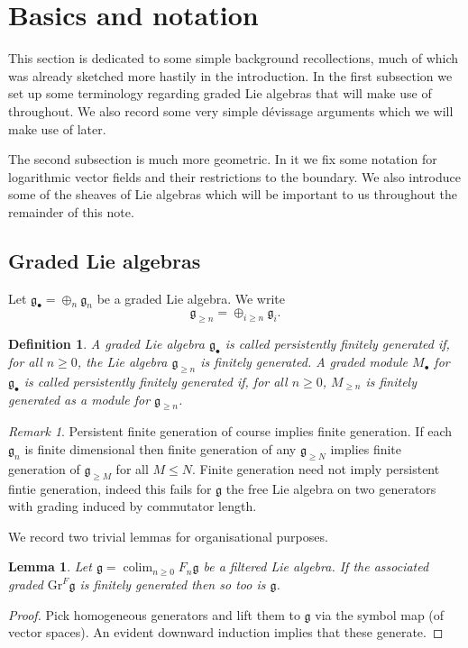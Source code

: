 \documentclass[12pt, oneside]{amsart}       %
\newtheorem{definition}[theorem]{Definition}
\newtheorem{lemma}[theorem]{Lemma}
\theoremstyle{remark}
\newtheorem*{remark}{Remark}
\renewcommand{\geq}{\geqslant}
\renewcommand{\leq}{\leqslant}
\newcommand{\clm}{\operatorname{colim}}
\newcommand{\g}{\mathfrak{g}}
\begin{document}
\section{Basics and notation}This section is dedicated to some simple background recollections, much of which was already sketched more hastily in the introduction. In the first subsection we set up some terminology regarding graded Lie algebras that will make use of throughout. We also record some very simple d\'{e}vissage arguments which we will make use of later. 

The second subsection is much more geometric. In it we fix some notation for logarithmic vector fields and their restrictions to the boundary. We also introduce some of the sheaves of Lie algebras which will be important to us throughout the remainder of this note.

\subsection{Graded Lie algebras}\label{Lie bit} Let $\g_\bullet=\oplus_n\g_n$ be a graded Lie algebra. We write $$\g_{\geq n}=\oplus_{i\geq n}\g_i.$$ \begin{definition}A graded Lie algebra $\g_\bullet$ is called persistently finitely generated if, for all $n\geq 0$, the Lie algebra $\g_{\geq n}$ is finitely generated. A graded module $M_\bullet$ for $\g_\bullet$ is called persistently finitely generated if, for all $n\geq 0$, $M_{\geq n}$ is finitely generated as a module for $\g_{\geq n}$. \end{definition}\begin{remark}Persistent finite generation of course implies finite generation. If each $\g_n$ is finite dimensional then finite generation of any $\g_{\geq N}$ implies finite generation of $\g_{\geq M}$ for all $M\leq N$. Finite generation need not imply persistent fintie generation, indeed this fails for $\g$ the free Lie algebra on two generators with grading induced by commutator length. \end{remark} We record two trivial lemmas for organisational purposes. \begin{lemma}\label{gr finite} Let $\g=\clm_{n\geq 0} F_n\g$ be a filtered Lie algebra. If the associated graded $\mathrm{Gr}^F\g$ is finitely generated then so too is $\g$. \end{lemma} \begin{proof}Pick homogeneous generators and lift them to $\g$ via the symbol map (of vector spaces). An evident downward induction implies that these generate. \end{proof}
\end{document}
